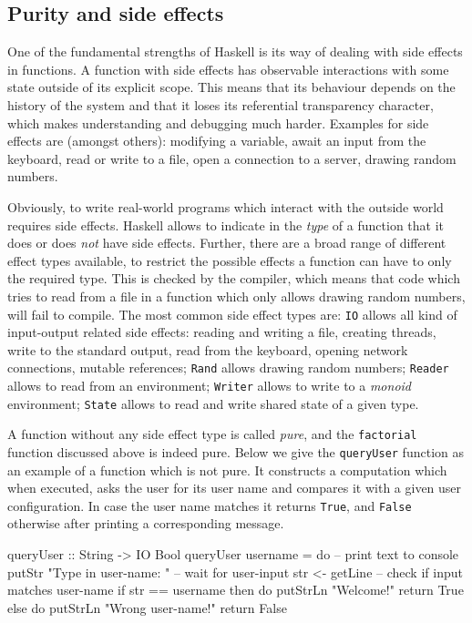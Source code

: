 \subsection{Purity and side effects}
\label{sec:purity_sideeffects}
One of the fundamental strengths of Haskell is its way of dealing with side effects in functions. A function with side effects has observable interactions with some state outside of its explicit scope. This means that its behaviour depends on the history of the system and that it loses its referential transparency character, which makes understanding and debugging much harder. Examples for side effects are (amongst others): modifying a variable, await an input from the keyboard, read or write to a file, open a connection to a server, drawing random numbers.

Obviously, to write real-world programs which interact with the outside world requires side effects. Haskell allows to indicate in the \textit{type} of a function that it does or does \textit{not} have side effects. Further, there are a broad range of different effect types available, to restrict the possible effects a function can have to only the required type. This is checked by the compiler, which means that code which tries to read from a file in a function which only allows drawing random numbers, will fail to compile. The most common side effect types are: \texttt{IO} allows all kind of input-output related side effects: reading and writing a file, creating threads, write to the standard output, read from the keyboard, opening network connections, mutable references; \texttt{Rand} allows drawing random numbers; \texttt{Reader} allows to read from an environment; \texttt{Writer} allows to write to a \textit{monoid} environment; \texttt{State} allows to read and write shared state of a given type.

A function without any side effect type is called \textit{pure}, and the \texttt{factorial} function discussed above is indeed pure. Below we give the \texttt{queryUser} function as an example of a function which is not pure. It constructs a computation which when executed, asks the user for its user name and compares it with a given user configuration. In case the user name matches it returns \texttt{True}, and \texttt{False} otherwise after printing a corresponding message. 

\begin{HaskellCode}
queryUser :: String -> IO Bool
queryUser username = do
  -- print text to console
  putStr "Type in user-name: "
  -- wait for user-input
  str <- getLine
  -- check if input matches user-name
  if str == username
    then do
      putStrLn "Welcome!"			
      return True
    else do
      putStrLn "Wrong user-name!"
      return False
\end{HaskellCode}

